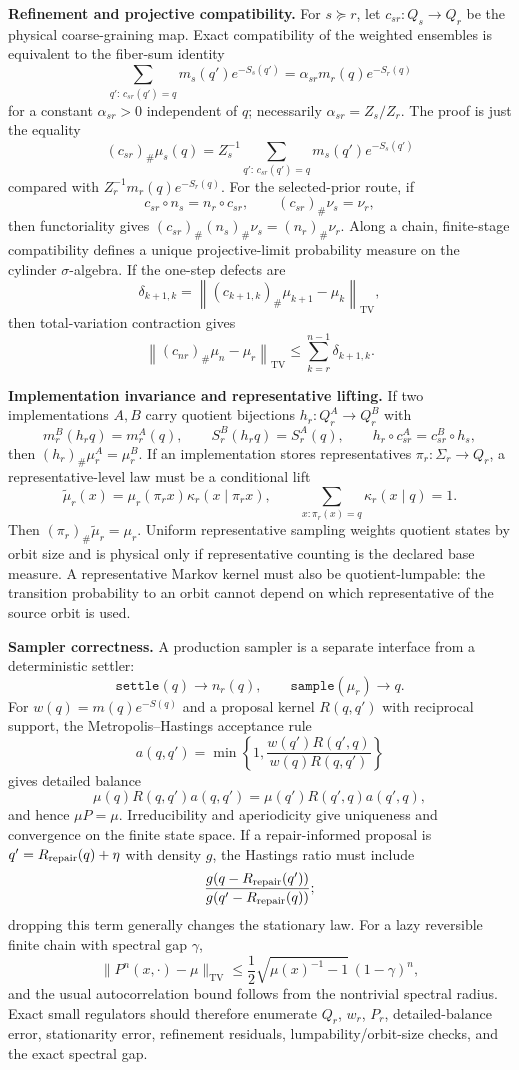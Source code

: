 \textbf{Refinement and projective compatibility.} For \(s\succeq r\), let
\(c_{sr}:Q_s\to Q_r\) be the physical coarse-graining map. Exact compatibility of the weighted
ensembles is equivalent to the fiber-sum identity
\[
\sum_{q':\,c_{sr}(q')=q}m_s(q')e^{-S_s(q')}
=
\alpha_{sr}m_r(q)e^{-S_r(q)}
\]
for a constant \(\alpha_{sr}>0\) independent of \(q\); necessarily
\(\alpha_{sr}=Z_s/Z_r\). The proof is just the equality
\[
(c_{sr})_\#\mu_s(q)
=
Z_s^{-1}\sum_{q':\,c_{sr}(q')=q}m_s(q')e^{-S_s(q')}
\]
compared with \(Z_r^{-1}m_r(q)e^{-S_r(q)}\). For the selected-prior route, if
\[
c_{sr}\circ n_s=n_r\circ c_{sr},
\qquad
(c_{sr})_\#\nu_s=\nu_r,
\]
then functoriality gives \((c_{sr})_\#(n_s)_\#\nu_s=(n_r)_\#\nu_r\). Along a chain, finite-stage
compatibility defines a unique projective-limit probability measure on the cylinder
\(\sigma\)-algebra. If the one-step defects are
\[
\delta_{k+1,k}
=
\left\|(c_{k+1,k})_\#\mu_{k+1}-\mu_k\right\|_{\mathrm{TV}},
\]
then total-variation contraction gives
\[
\left\|(c_{nr})_\#\mu_n-\mu_r\right\|_{\mathrm{TV}}
\le
\sum_{k=r}^{n-1}\delta_{k+1,k}.
\]

\textbf{Implementation invariance and representative lifting.} If two implementations \(A,B\)
carry quotient bijections \(h_r:Q_r^A\to Q_r^B\) with
\[
m_r^B(h_rq)=m_r^A(q),\qquad
S_r^B(h_rq)=S_r^A(q),
\qquad
h_r\circ c_{sr}^A=c_{sr}^B\circ h_s,
\]
then \((h_r)_\#\mu_r^A=\mu_r^B\). If an implementation stores representatives
\(\pi_r:\Sigma_r\to Q_r\), a representative-level law must be a conditional lift
\[
\widetilde\mu_r(x)=\mu_r(\pi_r x)\kappa_r(x\mid \pi_r x),
\qquad
\sum_{x:\pi_r(x)=q}\kappa_r(x\mid q)=1.
\]
Then \((\pi_r)_\#\widetilde\mu_r=\mu_r\). Uniform representative sampling weights quotient
states by orbit size and is physical only if representative counting is the declared base
measure. A representative Markov kernel must also be quotient-lumpable: the transition
probability to an orbit cannot depend on which representative of the source orbit is used.

\textbf{Sampler correctness.} A production sampler is a separate interface from a deterministic
settler:
\[
\texttt{settle}(q)\to n_r(q),\qquad
\texttt{sample}(\mu_r)\to q.
\]
For \(w(q)=m(q)e^{-S(q)}\) and a proposal kernel \(R(q,q')\) with reciprocal support, the
Metropolis--Hastings acceptance rule
\[
a(q,q')=\min\left\{1,
\frac{w(q')R(q',q)}{w(q)R(q,q')}
\right\}
\]
gives detailed balance
\[
\mu(q)R(q,q')a(q,q')=\mu(q')R(q',q)a(q',q),
\]
and hence \(\mu P=\mu\). Irreducibility and aperiodicity give uniqueness and convergence on the
finite state space. If a repair-informed proposal is \(q'=R_{\rm repair}(q)+\eta\) with density
\(g\), the Hastings ratio must include
\[
\frac{g(q-R_{\rm repair}(q'))}{g(q'-R_{\rm repair}(q))};
\]
dropping this term generally changes the stationary law. For a lazy reversible finite chain with
spectral gap \(\gamma\),
\[
\|P^n(x,\cdot)-\mu\|_{\mathrm{TV}}
\le
\frac12\sqrt{\mu(x)^{-1}-1}\,(1-\gamma)^n,
\]
and the usual autocorrelation bound follows from the nontrivial spectral radius. Exact small
regulators should therefore enumerate \(Q_r\), \(w_r\), \(P_r\), detailed-balance error,
stationarity error, refinement residuals, lumpability/orbit-size checks, and the exact spectral
gap.

